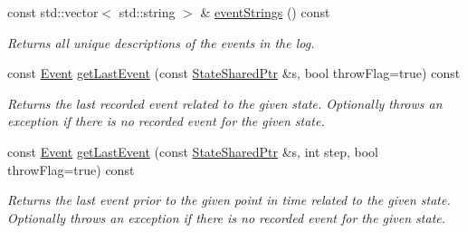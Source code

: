 \begin{DoxyCompactItemize}
const std\+::vector$<$ std\+::string $>$ \& \hyperlink{structAlgorithmLog_a4a48cc03a951ec66da39d65b77b3f5ce}{event\+Strings} () const 
\begin{DoxyCompactList}\small\item\em Returns all unique descriptions of the events in the log. \end{DoxyCompactList}\item 
const \hyperlink{structAlgorithmLog_a7e0d48b82e3a6cbe4128c08f936fee9a}{Event} \hyperlink{structAlgorithmLog_a09a134c830a0a2ec96b7c6dd7fff6453}{get\+Last\+Event} (const \hyperlink{structAlgorithmLog_aa938278830c04450a447beb9ff249b3f}{State\+Shared\+Ptr} \&s, bool throw\+Flag=true) const 
\begin{DoxyCompactList}\small\item\em Returns the last recorded event related to the given state. Optionally throws an exception if there is no recorded event for the given state. \end{DoxyCompactList}\item 
const \hyperlink{structAlgorithmLog_a7e0d48b82e3a6cbe4128c08f936fee9a}{Event} \hyperlink{structAlgorithmLog_a0857d6c5c15db8f45d17f785469ac834}{get\+Last\+Event} (const \hyperlink{structAlgorithmLog_aa938278830c04450a447beb9ff249b3f}{State\+Shared\+Ptr} \&s, int step, bool throw\+Flag=true) const 
\begin{DoxyCompactList}\small\item\em Returns the last event prior to the given point in time related to the given state. Optionally throws an exception if there is no recorded event for the given state. \end{DoxyCompactList}\end{DoxyCompactItemize}
